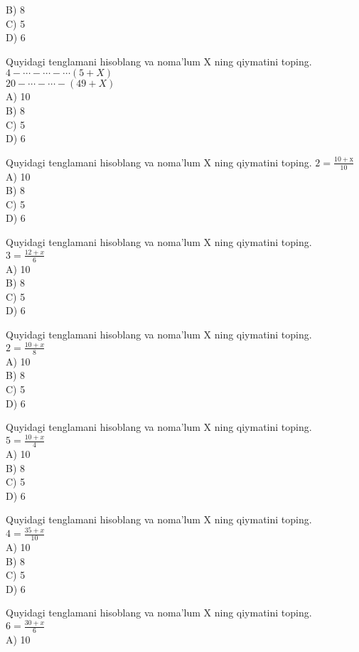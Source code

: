 B) 8\\
C) 5\\
D) 6
  \item Quyidagi tenglamani hisoblang va noma'lum X ning qiymatini toping.\\
$4-\cdots-\cdots-\cdots(5+X)$\\
$20-\cdots-\cdots-(49+X)$\\
A) 10\\
B) 8\\
C) 5\\
D) 6
  \item Quyidagi tenglamani hisoblang va noma'lum X ning qiymatini toping. $2=\frac{10+\mathrm{x}}{10}$\\
A) 10\\
B) 8\\
C) 5\\
D) 6
  \item Quyidagi tenglamani hisoblang va noma'lum X ning qiymatini toping.\\
$3=\frac{12+x}{6}$\\
A) 10\\
B) 8\\
C) 5\\
D) 6
  \item Quyidagi tenglamani hisoblang va noma'lum X ning qiymatini toping.\\
$2=\frac{10+x}{8}$\\
A) 10\\
B) 8\\
C) 5\\
D) 6
  \item Quyidagi tenglamani hisoblang va noma'lum X ning qiymatini toping.\\
$5=\frac{10+x}{4}$\\
A) 10\\
B) 8\\
C) 5\\
D) 6
  \item Quyidagi tenglamani hisoblang va noma'lum X ning qiymatini toping.\\
$4=\frac{35+x}{10}$\\
A) 10\\
B) 8\\
C) 5\\
D) 6
  \item Quyidagi tenglamani hisoblang va noma'lum X ning qiymatini toping.\\
$6=\frac{30+x}{6}$\\
A) 10\\
